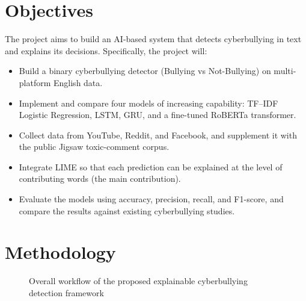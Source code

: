 \documentclass[12pt,a4paper]{article}
\begin{document}
\section{Objectives}
The project aims to build an AI-based system that detects cyberbullying in text and explains its decisions. Specifically, the project will:

\begin{itemize}[leftmargin=1.4em]
    \item Build a binary cyberbullying detector (Bullying vs Not-Bullying) on multi-platform English data.
    \item Implement and compare four models of increasing capability: TF--IDF Logistic Regression, LSTM, GRU, and a fine-tuned RoBERTa transformer.
    \item Collect data from YouTube, Reddit, and Facebook, and supplement it with the public Jigsaw toxic-comment corpus.
    \item Integrate LIME so that each prediction can be explained at the level of contributing words (the main contribution).
    \item Evaluate the models using accuracy, precision, recall, and F1-score, and compare the results against existing cyberbullying studies.
\end{itemize}

\section{Methodology}

\begin{figure}[H]
    \centering
    \caption{Overall workflow of the proposed explainable cyberbullying detection framework}
    \label{fig:workflow}
\end{figure}
\end{document}
